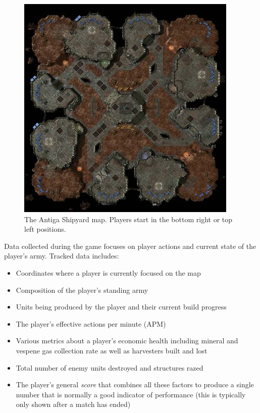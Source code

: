 \documentclass{nime-document-class}
\begin{document}
\begin{figure}[htbp]
	\centering
		\includegraphics[width=1\columnwidth]{antiga-shipyard.jpeg}
	\caption{The Antiga Shipyard map. Players start in the bottom right or top left positions.}
	\label{fig:AntigaShipyardFigure}
\end{figure}

Data collected during the game focuses on player actions and current state of the player's army.
Tracked data includes:
\begin{itemize} \itemsep1pt \parskip0pt 
  \item Coordinates where a player is currently focused on the map
  \item Composition of the player's standing army
  \item Units being produced by the player and their current build progress
  \item The player's effective actions per minute (APM)
  \item Various metrics about a player's economic health including mineral and vespene gas collection rate as well as harvesters built and lost
  \item Total number of enemy units destroyed and structures razed
  \item The player's general {\em score} that combines all these factors to produce a single number that is normally a good indicator of performance (this is typically only shown after a match has ended)
\end{itemize}
\end{document}
